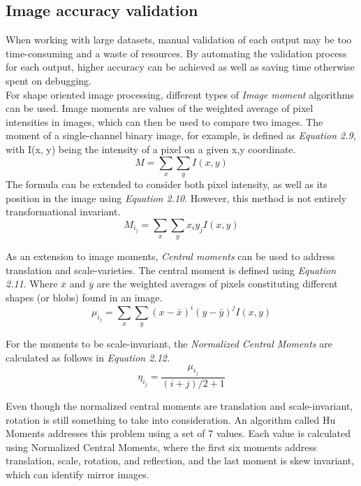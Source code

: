 \subsection{Image accuracy validation}
When working with large datasets, manual validation of each output may be too time-consuming and a waste of resources. By automating the validation process for each output, higher accuracy can be achieved as well as saving time otherwise spent on debugging.  \\

\noindent For shape oriented image processing, different types of \textit{Image moment}\cite{Huang}\cite{Chaumette} algorithms can be used. Image moments are values of the weighted average of pixel intensities in images, which can then be used to compare two images. The moment of a single-channel binary image, for example, is defined as \textit{Equation 2.9}, with I(x, y) being the intensity of a pixel on a given x,y coordinate. \begin{equation}
    M = \sum_x \sum_y{I(x, y)}
\end{equation} The formula can be extended to consider both pixel intensity, as well as its position in the image using \textit{Equation 2.10}. However, this method is not entirely transformational invariant.\\ \begin{equation}
    M_i_j = \sum_x \sum_y{x_iy_jI(x, y)}
\end{equation} 

\noindent As an extension to image moments, \textit{Central moments} can be used to address translation and scale-varieties. The central moment is defined using \textit{Equation 2.11}. Where $\overline{x}$ and $\overline{y}$ are the weighted averages of pixels constituting different shapes (or blobs) found in an image.\\

\begin{equation}
    \mu_i_j = \sum_x \sum_y{(x - \bar{x})^i(y - \bar{y})^jI(x, y)}
\end{equation}  
 
\noindent For the moments to be scale-invariant, the \textit{Normalized Central Moments} are calculated as follows in \textit{Equation 2.12.}\\
\begin{equation}
    \eta_i_j = \frac{\mu_i_j}{(i+j)/2+1}
\end{equation} 
 
\noindent Even though the normalized central moments are translation and scale-invariant, rotation is still something to take into consideration. An algorithm called Hu Moments addresses this problem using a set of 7 values. Each value is calculated using Normalized Central Moments, where the first six moments address translation, scale, rotation, and reflection, and the last moment is skew invariant, which can identify mirror images.






